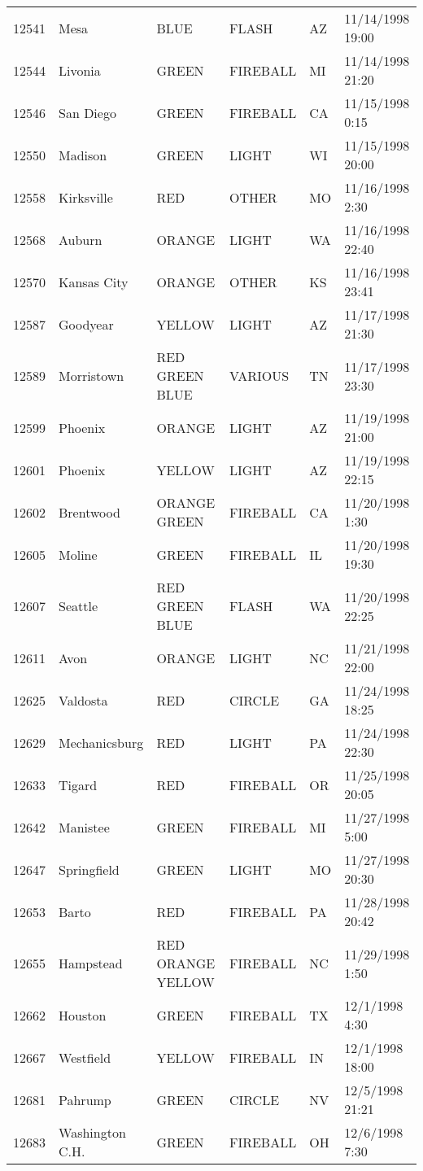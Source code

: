 \begin{tabular}{llllll}
12541 & Mesa & BLUE & FLASH & AZ & 11/14/1998 19:00 \\
12544 & Livonia & GREEN & FIREBALL & MI & 11/14/1998 21:20 \\
12546 & San Diego & GREEN & FIREBALL & CA & 11/15/1998 0:15 \\
12550 & Madison & GREEN & LIGHT & WI & 11/15/1998 20:00 \\
12558 & Kirksville & RED & OTHER & MO & 11/16/1998 2:30 \\
12568 & Auburn & ORANGE & LIGHT & WA & 11/16/1998 22:40 \\
12570 & Kansas City & ORANGE & OTHER & KS & 11/16/1998 23:41 \\
12587 & Goodyear & YELLOW & LIGHT & AZ & 11/17/1998 21:30 \\
12589 & Morristown & RED GREEN BLUE & VARIOUS & TN & 11/17/1998 23:30 \\
12599 & Phoenix & ORANGE & LIGHT & AZ & 11/19/1998 21:00 \\
12601 & Phoenix & YELLOW & LIGHT & AZ & 11/19/1998 22:15 \\
12602 & Brentwood & ORANGE GREEN & FIREBALL & CA & 11/20/1998 1:30 \\
12605 & Moline & GREEN & FIREBALL & IL & 11/20/1998 19:30 \\
12607 & Seattle & RED GREEN BLUE & FLASH & WA & 11/20/1998 22:25 \\
12611 & Avon & ORANGE & LIGHT & NC & 11/21/1998 22:00 \\
12625 & Valdosta & RED & CIRCLE & GA & 11/24/1998 18:25 \\
12629 & Mechanicsburg & RED & LIGHT & PA & 11/24/1998 22:30 \\
12633 & Tigard & RED & FIREBALL & OR & 11/25/1998 20:05 \\
12642 & Manistee & GREEN & FIREBALL & MI & 11/27/1998 5:00 \\
12647 & Springfield & GREEN & LIGHT & MO & 11/27/1998 20:30 \\
12653 & Barto & RED & FIREBALL & PA & 11/28/1998 20:42 \\
12655 & Hampstead & RED ORANGE YELLOW & FIREBALL & NC & 11/29/1998 1:50 \\
12662 & Houston & GREEN & FIREBALL & TX & 12/1/1998 4:30 \\
12667 & Westfield & YELLOW & FIREBALL & IN & 12/1/1998 18:00 \\
12681 & Pahrump & GREEN & CIRCLE & NV & 12/5/1998 21:21 \\
12683 & Washington C.H. & GREEN & FIREBALL & OH & 12/6/1998 7:30 \\

\end{tabular}
